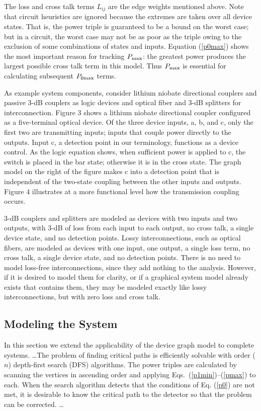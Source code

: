 The loss and cross talk terms $ L_{ij} $ are the edge weights mentioned
above.  Note that circuit heuristics are ignored because the extremes are
taken over all device states.  That is, the power triple is guaranteed to
be a bound on the worst case; but in a circuit, the worst case may not be
as poor as the triple owing to the exclusion of some combinations of states
and inputs.  Equation (\ref{p0max}) shows the most important reason for
tracking $P_{\rm max}$: the greatest power produces the largest possible
cross talk term in this model.  Thus $P_{\rm max}$ is essential for
calculating subsequent $ P_{0\rm max} $ terms.

As example system components, consider lithium niobate directional couplers
and passive 3-dB couplers as logic devices and optical fiber and 3-dB
splitters for interconnection.  Figure 3 shows a lithium niobate
directional coupler configured as a five-terminal optical device.\cite{6}
Of the three device inputs, a, b, and c, only the first two are
transmitting inputs; inputs that couple power directly to the outputs. 
Input c, a detection point in our terminology, functions as a device
control.  As the logic equation shows, when sufficient power is applied to
c, the switch is placed in the bar state; otherwise it is in the cross
state.  The graph model on the right of the figure makes c into a detection
point that is independent of the two-state coupling between the other
inputs and outputs.  Figure 4 illustrates at a more functional level how
the transmission coupling occurs.


3-dB couplers and splitters are modeled as devices with two inputs and two
outputs, with 3-dB of loss from each input to each output, no cross talk, a
single device state, and no detection points.  Lossy interconnections, such
as optical fibers, are modeled as devices with one input, one output, a
single loss term, no cross talk, a single device state, and no detection
points.  There is no need to model loss-free interconnections, since they
add nothing to the analysis. However, if it is desired to model them for
clarity, or if a graphical system model already exists that contains them,
they may be modeled exactly like lossy interconnections, but with zero loss
and cross talk.

\subsection{ Modeling the System}
In this section we extend the applicability of the device graph model to
complete systems.  \ldots The problem of finding critical paths is
efficiently solvable with order ($n$) depth-first search (DFS)
algorithms.\cite{9} The power triples are calculated by scanning the
vertices in ascending order and applying Eqs.\ (\ref{p1min})--(\ref{pmax})
to each.  When the search algorithm detects that the conditions of Eq. 
(\ref{p0}) are not met, it is desirable to know the critical path to the
detector so that the problem can be corrected. \ldots


